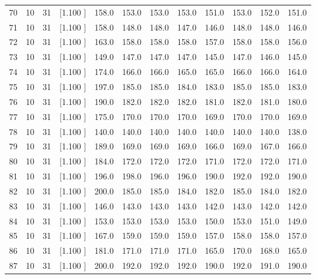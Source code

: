 \documentclass[12pt,a4paper]{article}
\begin{document}
\begin{center}
{\begin{tabular}{r r r r r r r r r r r r}
  70& 10& 31&[1.100     ]&   158.0&   153.0&   153.0&   153.0&   151.0&   153.0&   152.0&   151.0\\[-0.02in]
  71& 10& 31&[1.100     ]&   158.0&   148.0&   148.0&   147.0&   146.0&   148.0&   148.0&   146.0\\[-0.02in]
  72& 10& 31&[1.100     ]&   163.0&   158.0&   158.0&   158.0&   157.0&   158.0&   158.0&   156.0\\[-0.02in]
  73& 10& 31&[1.100     ]&   149.0&   147.0&   147.0&   147.0&   145.0&   147.0&   146.0&   145.0\\[-0.02in]
  74& 10& 31&[1.100     ]&   174.0&   166.0&   166.0&   165.0&   165.0&   166.0&   166.0&   164.0\\[-0.02in]
  75& 10& 31&[1.100     ]&   197.0&   185.0&   185.0&   184.0&   183.0&   185.0&   185.0&   183.0\\[-0.02in]
  76& 10& 31&[1.100     ]&   190.0&   182.0&   182.0&   182.0&   181.0&   182.0&   181.0&   180.0\\[-0.02in]
  77& 10& 31&[1.100     ]&   175.0&   170.0&   170.0&   170.0&   169.0&   170.0&   170.0&   169.0\\[-0.02in]
  78& 10& 31&[1.100     ]&   140.0&   140.0&   140.0&   140.0&   140.0&   140.0&   140.0&   138.0\\[-0.02in]
  79& 10& 31&[1.100     ]&   189.0&   169.0&   169.0&   169.0&   166.0&   169.0&   167.0&   166.0\\[-0.02in]
  80& 10& 31&[1.100     ]&   184.0&   172.0&   172.0&   172.0&   171.0&   172.0&   172.0&   171.0\\[-0.02in]
  81& 10& 31&[1.100     ]&   196.0&   198.0&   196.0&   196.0&   190.0&   192.0&   192.0&   190.0\\[-0.02in]
  82& 10& 31&[1.100     ]&   200.0&   185.0&   185.0&   184.0&   182.0&   185.0&   184.0&   182.0\\[-0.02in]
  83& 10& 31&[1.100     ]&   146.0&   143.0&   143.0&   143.0&   142.0&   143.0&   142.0&   142.0\\[-0.02in]
  84& 10& 31&[1.100     ]&   153.0&   153.0&   153.0&   153.0&   150.0&   153.0&   151.0&   149.0\\[-0.02in]
  85& 10& 31&[1.100     ]&   167.0&   159.0&   159.0&   159.0&   157.0&   158.0&   158.0&   157.0\\[-0.02in]
  86& 10& 31&[1.100     ]&   181.0&   171.0&   171.0&   171.0&   165.0&   170.0&   168.0&   165.0\\[-0.02in]
  87& 10& 31&[1.100     ]&   200.0&   192.0&   192.0&   192.0&   190.0&   192.0&   191.0&   190.0\\[-0.02in]

\end{tabular}}
\end{center}
\end{document}
